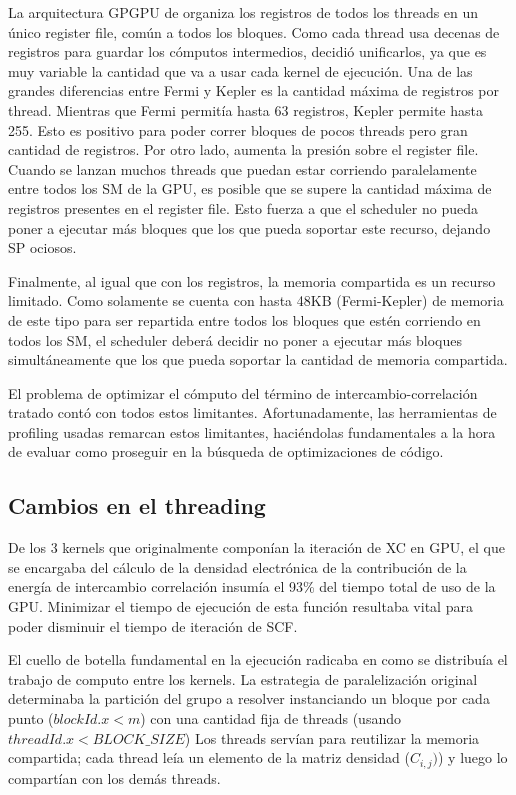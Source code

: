La arquitectura GPGPU de \nvidia organiza los registros de todos los threads en un \'unico
register file, com\'un a todos los bloques. Como cada thread usa decenas de registros para guardar
los c\'omputos intermedios, \nvidia decidi\'o unificarlos, ya que es muy variable la cantidad que va a usar
cada kernel de ejecuci\'on. Una de las grandes diferencias entre Fermi y Kepler es la cantidad m\'axima de
registros por thread. Mientras que Fermi permit\'ia hasta 63 registros, Kepler permite hasta 255. Esto
es positivo para poder correr bloques de pocos threads pero gran cantidad de registros. Por otro lado,
aumenta la presi\'on sobre el register file. Cuando se lanzan muchos threads
que puedan estar corriendo paralelamente entre todos los SM de la GPU, es posible que se supere
la cantidad m\'axima de registros presentes en el register file. Esto fuerza a que el scheduler
no pueda poner a ejecutar m\'as bloques que los que pueda soportar este recurso, dejando SP ociosos.

Finalmente, al igual que con los registros, la memoria compartida es un recurso limitado. Como
solamente se cuenta con hasta 48KB (Fermi-Kepler) de memoria de este tipo para ser repartida entre
todos los bloques que est\'en corriendo en todos los SM, el scheduler deber\'a decidir no poner a ejecutar
m\'as bloques simult\'aneamente que los que pueda soportar la cantidad de memoria compartida.

El problema de optimizar el c\'omputo del t\'ermino de intercambio-correlaci\'on tratado  cont\'o
con todos estos limitantes. Afortunadamente,
las herramientas de profiling usadas remarcan estos limitantes, haci\'endolas
fundamentales a la hora de evaluar como proseguir en la b\'usqueda de optimizaciones de c\'odigo.

\subsection{Cambios en el threading}
\label{threading}

De los 3 kernels que originalmente compon\'ian la iteraci\'on de XC en GPU, el que se encargaba
del c\'alculo de la densidad electr\'onica de la contribuci\'on de la energ\'ia de intercambio correlaci\'on
insum\'ia el 93\% del tiempo total de uso de la GPU. Minimizar el tiempo de ejecuci\'on de
esta funci\'on resultaba vital para poder disminuir el tiempo de iteraci\'on de SCF.

El cuello de botella fundamental en la ejecuci\'on radicaba en como se distribu\'ia el trabajo de computo
entre los kernels. La estrategia de paralelizaci\'on original determinaba la partici\'on
del grupo a resolver instanciando un bloque por cada punto ({$blockId.x < m$})
con una cantidad fija de threads (usando $threadId.x < BLOCK\_SIZE$)
Los threads serv\'ian para reutilizar la memoria compartida; cada thread le\'ia un
elemento de la matriz densidad ($C_{i,j})$) y luego lo compart\'ian con los
dem\'as threads.

